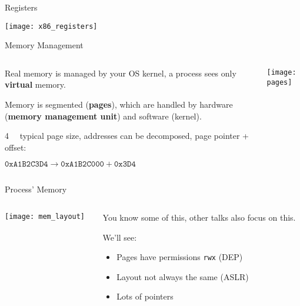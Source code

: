 \documentclass[beamer]{uibk}
\begin{document}
\begin{frame}{Registers}
    \begin{center}
        \texttt{[image: x86\_registers]}
    \end{center}
\end{frame}

\begin{frame}{Memory Management}
    \begin{columns}
        \begin{column}{0.45\textwidth}
            Real memory is managed by your OS kernel, a process sees only
            \textbf{virtual} memory.

            \medskip

            Memory is segmented (\textbf{pages}), which are handled by hardware
            (\textbf{memory management unit}) and software (kernel).

            \medskip

            \SI{4}{\kibi\byte} typical page size, addresses can be decomposed,
            page pointer + offset:

            $\mathtt{0xA1B2C3D4} \to \texttt{0xA1B2C000} + \mathtt{0x3D4}$
        \end{column}
        \begin{column}{0.55\textwidth}
            \texttt{[image: pages]}
        \end{column}
    \end{columns}
\end{frame}

\begin{frame}{Process' Memory}
    \begin{columns}
        \begin{column}{0.5\textwidth}
            \begin{center}
                \texttt{[image: mem\_layout]}
            \end{center}
        \end{column}
        \begin{column}{0.5\textwidth}
            You know some of this, other talks also focus on this.

            \bigskip

            We'll see:
            \begin{itemize}
                \item Pages have permissions \texttt{rwx} (DEP)
                \item Layout not always the same (ASLR)
                \item Lots of pointers
            \end{itemize}
        \end{column}
    \end{columns}
\end{frame}
\end{document}

